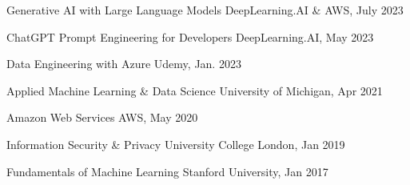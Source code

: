 
\begin{cventries}

  	\vspace{-0.1cm}
    \cventry
    {}
    {Generative AI with Large Language Models}
    {DeepLearning.AI \& AWS, July 2023} %
    {} %
    {}
    
    \vspace{-0.8cm}
    \cventry
    {}
    {ChatGPT Prompt Engineering for Developers}
    {DeepLearning.AI, May 2023}
    {}
    {}
    
    \vspace{-0.8cm}
    \cventry
    {}
    {Data Engineering with Azure}
    {Udemy, Jan. 2023}
    {}
    {}
    
    \vspace{-0.8cm}
    \cventry
    {}
    {Applied Machine Learning \& Data Science}
    {University of Michigan, Apr 2021}
    {}
    {}
    
    \vspace{-0.8cm}
    \cventry
    {}
    {Amazon Web Services}
    {AWS, May 2020}
    {}
    {}
    
    \vspace{-0.8cm}
    \cventry
    {}
    {Information Security \& Privacy}
    {University College London, Jan 2019}
    {}
    {}
    
    \vspace{-0.8cm}
    \cventry
    {}
    {Fundamentals of Machine Learning}
    {Stanford University, Jan 2017}
    {}
    {}
    
	
	\vspace{-0.9cm}
\end{cventries}
